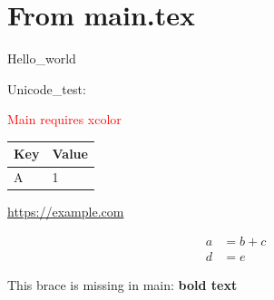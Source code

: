 \documentclass{article}
\begin{document}
\section{From main.tex}



Hello\_world

Unicode\_test: 🙂

\textcolor{red}{Main requires xcolor}

\begin{tabular}{ll}
\toprule
Key & Value \\
\midrule
A & 1 \\
\bottomrule
\end{tabular}

\url{https://example.com}

\begin{align}
a &= b + c \\
d &= e
\end{align}


This brace is missing in main: \textbf{bold text}
\end{document}
